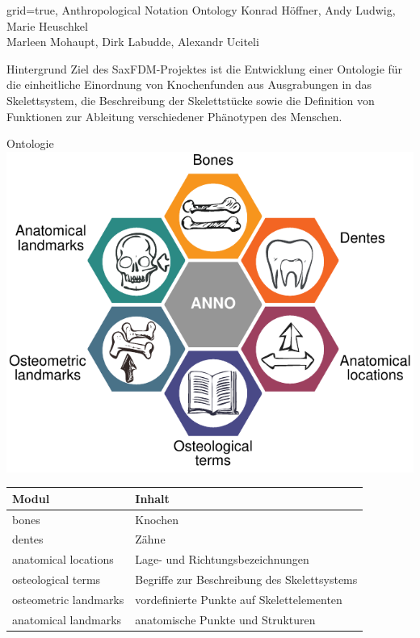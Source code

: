 \documentclass[portrait,final,a0paper,fontscale=0.320]{imiseposter}
\begin{document}
\begin{poster}%
  {grid=true,}
  {}
  {Anthropological Notation Ontology}
  {Konrad Höffner, Andy Ludwig, Marie Heuschkel\\Marleen Mohaupt, Dirk Labudde, Alexandr Uciteli}
  {%
  }

\begin{posterbox}[name=background,column=0,row=0]{Hintergrund}
Ziel des SaxFDM-Projektes ist die Entwicklung einer Ontologie für die einheitliche Einordnung von Knochenfunden aus Ausgrabungen in das Skelettsystem, die Beschreibung der Skelettstücke sowie die Definition von Funktionen zur Ableitung verschiedener Phänotypen des Menschen. 
\end{posterbox}
\begin{posterbox}[name=ontology,below=background]{Ontologie}
\includegraphics[width=\textwidth]{img/anno.pdf}
\begin{tabular}{ll}
\toprule
\textbf{Modul}			&\textbf{Inhalt}\\
\midrule
bones					&Knochen\\
dentes					&Zähne\\
anatomical locations	&Lage- und Richtungsbezeichnungen\\
osteological terms		&Begriffe zur Beschreibung des Skelettsystems\\
osteometric landmarks	&vordefinierte Punkte auf Skelettelementen\\
anatomical landmarks	&anatomische Punkte und Strukturen\\
\bottomrule
\end{tabular}


\end{posterbox}
\end{poster}
\end{document}
